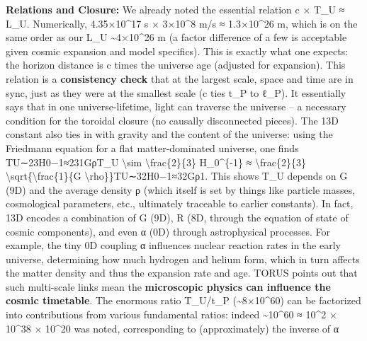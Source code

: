 \documentclass[
]{article}
\begin{document}
\textbf{Relations and Closure:} We already noted the essential relation
c × T\_U ≈ L\_U\hspace{0pt}. Numerically, 4.35×10\^{}17 s × 3×10\^{}8
m/s ≈ 1.3×10\^{}26 m, which is on the same order as our L\_U
\textasciitilde4×10\^{}26 m (a factor difference of a few is acceptable
given cosmic expansion and model specifics)\hspace{0pt}. This is exactly
what one expects: the horizon distance is c times the universe age
(adjusted for expansion). This relation is a \textbf{consistency check}
that at the largest scale, space and time are in sync, just as they were
at the smallest scale (c ties t\_P to ℓ\_P). It essentially says that in
one universe-lifetime, light can traverse the universe -- a necessary
condition for the toroidal closure (no causally disconnected
pieces)\hspace{0pt}. The 13D constant also ties in with gravity and the
content of the universe: using the Friedmann equation for a flat
matter-dominated universe, one finds TU∼23H0−1≈231GρT\_U
\textbackslash sim \textbackslash frac\{2\}\{3\} H\_0\^{}\{-1\} ≈
\textbackslash frac\{2\}\{3\}
\textbackslash sqrt\{\textbackslash frac\{1\}\{G
\textbackslash rho\}\}TU\hspace{0pt}∼32\hspace{0pt}H0−1\hspace{0pt}≈32\hspace{0pt}Gρ1\hspace{0pt}\hspace{0pt}\hspace{0pt}.
This shows T\_U depends on G (9D) and the average density ρ (which
itself is set by things like particle masses, cosmological parameters,
etc., ultimately traceable to earlier constants). In fact, 13D encodes a
combination of G (9D), R (8D, through the equation of state of cosmic
components), and even α (0D) through astrophysical
processes\hspace{0pt}. For example, the tiny 0D coupling α influences
nuclear reaction rates in the early universe, determining how much
hydrogen and helium form, which in turn affects the matter density and
thus the expansion rate and age. TORUS points out that such multi-scale
links mean the \textbf{microscopic physics can influence the cosmic
timetable}. The enormous ratio T\_U/t\_P (\textasciitilde8×10\^{}60) can
be factorized into contributions from various fundamental ratios: indeed
\textasciitilde10\^{}60 ≈ 10\^{}2 × 10\^{}38 × 10\^{}20 was
noted\hspace{0pt}, corresponding to (approximately) the inverse of α
\end{document}
